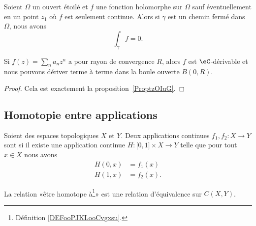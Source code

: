 \begin{proposition}   \label{PrpopwQSbJg}
	Soient \( \Omega\) un ouvert étoilé et \( f\) une fonction holomorphe sur \( \Omega\) sauf éventuellement en un point \( z_1\) où \( f\) est seulement continue. Alors si \( \gamma\) est un chemin fermé dans \( \Omega\), nous avons
	\begin{equation}
		\int_{\gamma}f=0.
	\end{equation}
\end{proposition}

\begin{proposition}     \label{PropRZCKeO}
	Si \( f(z)=\sum_na_nz^n\) a pour rayon de convergence \( R\), alors \( f\) est \( \eC\)-dérivable et nous pouvons dériver terme à terme dans la boule ouverte \( B(0,R)\).
\end{proposition}

\begin{proof}
	Cela est exactement la proposition~\ref{ProptzOIuG}.
\end{proof}

\subsection{Homotopie entre applications}

\begin{definition}       \label{DEFooPJKLooCvgxsu}
	Soient des espaces topologiques \( X\) et \( Y\). Deux applications continues \( f_1,f_2\colon X\to Y\) sont  si il existe une application continue \( H\colon \mathopen[ 0 , 1 \mathclose]\times X\to Y \) telle que pour tout \( x\in X \) nous avons
	\begin{subequations}
		\begin{align}
			H(0,x) & =f_1(x)  \\
			H(1,x) & =f_2(x).
		\end{align}
	\end{subequations}
\end{definition}

\begin{lemma}       \label{LEMooMGFZooGOaGYl}
	La relation «être homotope à\footnote{Définition \ref{DEFooPJKLooCvgxsu}.}»  est une relation d'équivalence sur \( C(X,Y)\).
\end{lemma}

